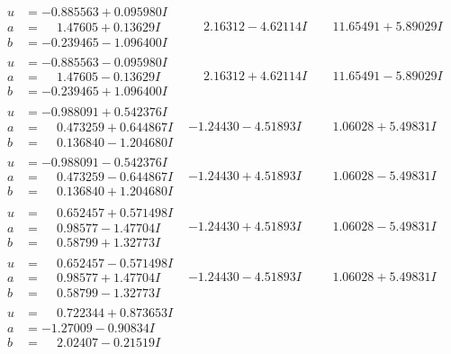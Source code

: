 \documentclass[1p]{elsarticle_modified}
\theoremstyle{definition}
\begin{document}
$$\begin{array}{c|c|c}
\begin{aligned}
u &= -0.885563 + 0.095980 I \\
a &= \phantom{-}1.47605 + 0.13629 I \\
b &= -0.239465 - 1.096400 I\end{aligned}
 & \phantom{-}2.16312 - 4.62114 I & \phantom{-}11.65491 + 5.89029 I \\ \hline\begin{aligned}
u &= -0.885563 - 0.095980 I \\
a &= \phantom{-}1.47605 - 0.13629 I \\
b &= -0.239465 + 1.096400 I\end{aligned}
 & \phantom{-}2.16312 + 4.62114 I & \phantom{-}11.65491 - 5.89029 I \\ \hline\begin{aligned}
u &= -0.988091 + 0.542376 I \\
a &= \phantom{-}0.473259 + 0.644867 I \\
b &= \phantom{-}0.136840 - 1.204680 I\end{aligned}
 & -1.24430 - 4.51893 I & \phantom{-}1.06028 + 5.49831 I \\ \hline\begin{aligned}
u &= -0.988091 - 0.542376 I \\
a &= \phantom{-}0.473259 - 0.644867 I \\
b &= \phantom{-}0.136840 + 1.204680 I\end{aligned}
 & -1.24430 + 4.51893 I & \phantom{-}1.06028 - 5.49831 I \\ \hline\begin{aligned}
u &= \phantom{-}0.652457 + 0.571498 I \\
a &= \phantom{-}0.98577 - 1.47704 I \\
b &= \phantom{-}0.58799 + 1.32773 I\end{aligned}
 & -1.24430 + 4.51893 I & \phantom{-}1.06028 - 5.49831 I \\ \hline\begin{aligned}
u &= \phantom{-}0.652457 - 0.571498 I \\
a &= \phantom{-}0.98577 + 1.47704 I \\
b &= \phantom{-}0.58799 - 1.32773 I\end{aligned}
 & -1.24430 - 4.51893 I & \phantom{-}1.06028 + 5.49831 I \\ \hline\begin{aligned}
u &= \phantom{-}0.722344 + 0.873653 I \\
a &= -1.27009 - 0.90834 I \\
b &= \phantom{-}2.02407 - 0.21519 I\end{aligned}

\end{array}$$
\end{document}
